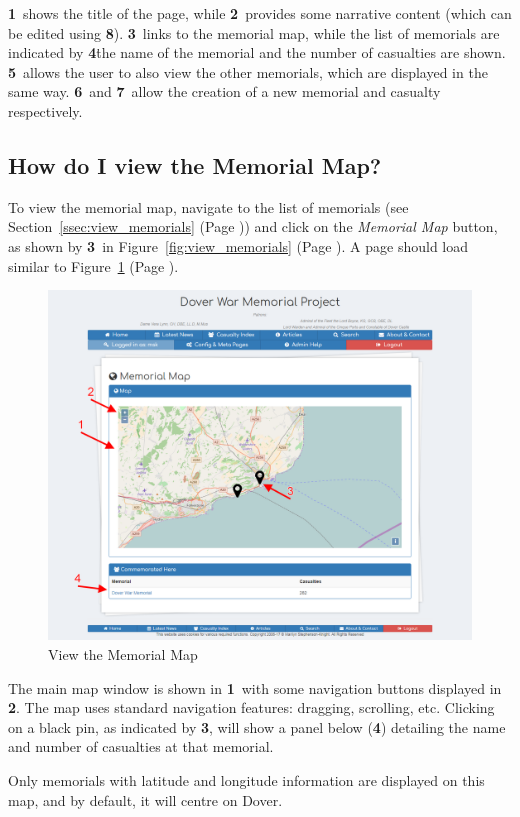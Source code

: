 \documentclass[12pt]{article}
\newcommand{\marker}[1]{\color{red}\textbf{#1}\color{black}}
\newcommand{\myref}[1]{\ref{#1} {\scriptsize(Page \pageref{#1})}}
\begin{document}
\marker{1}\ shows the title of the page, while \marker{2}\ provides some narrative content (which can be edited using \marker{8}). \marker{3}\ links to the memorial map, while the list of memorials are indicated by \marker{4}\. the name of the memorial and the number of casualties are shown. \marker{5}\ allows the user to also view the other memorials, which are displayed in the same way. \marker{6}\ and \marker{7}\ allow the creation of a new memorial and casualty respectively.

\newpage
\FloatBarrier
\subsection{How do I view the Memorial Map?}
To view the memorial map, navigate to the list of memorials (see Section~\myref{ssec:view_memorials}) and click on the \textit{Memorial Map} button, as shown by \marker{3}\ in Figure~\myref{fig:view_memorials}. A page should load similar to Figure~\myref{fig:view_map}.

\begin{figure}[h]
  \centering
 \includegraphics[width=.9\textwidth]{pics/view_map.png}
	\caption{View the Memorial Map}\label{fig:view_map}
\end{figure}

The main map window is shown in \marker{1}\ with some navigation buttons displayed in \marker{2}. The map uses standard navigation features: dragging, scrolling, etc. Clicking on a black pin, as indicated by \marker{3}, will show a panel below (\marker{4}) detailing the name and number of casualties at that memorial.
\begin{infoBox}
Only memorials with latitude and longitude information are displayed on this map, and by default, it will centre on Dover.
\end{infoBox}
\end{document}
